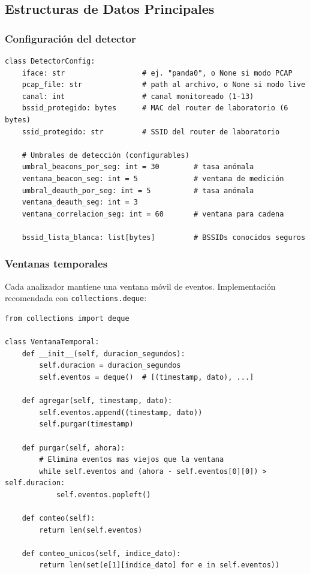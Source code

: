 \documentclass[11pt,a4paper]{article}
\begin{document}
\subsection{Estructuras de Datos Principales}

\subsubsection{Configuración del detector}

\begin{lstlisting}
class DetectorConfig:
    iface: str                  # ej. "panda0", o None si modo PCAP
    pcap_file: str              # path al archivo, o None si modo live
    canal: int                  # canal monitoreado (1-13)
    bssid_protegido: bytes      # MAC del router de laboratorio (6 bytes)
    ssid_protegido: str         # SSID del router de laboratorio

    # Umbrales de detección (configurables)
    umbral_beacons_por_seg: int = 30        # tasa anómala
    ventana_beacon_seg: int = 5             # ventana de medición
    umbral_deauth_por_seg: int = 5          # tasa anómala
    ventana_deauth_seg: int = 3
    ventana_correlacion_seg: int = 60       # ventana para cadena

    bssid_lista_blanca: list[bytes]         # BSSIDs conocidos seguros
\end{lstlisting}

\subsubsection{Ventanas temporales}

Cada analizador mantiene una ventana móvil de eventos. Implementación
recomendada con \texttt{collections.deque}:

\begin{lstlisting}
from collections import deque

class VentanaTemporal:
    def __init__(self, duracion_segundos):
        self.duracion = duracion_segundos
        self.eventos = deque()  # [(timestamp, dato), ...]

    def agregar(self, timestamp, dato):
        self.eventos.append((timestamp, dato))
        self.purgar(timestamp)

    def purgar(self, ahora):
        # Elimina eventos mas viejos que la ventana
        while self.eventos and (ahora - self.eventos[0][0]) > self.duracion:
            self.eventos.popleft()

    def conteo(self):
        return len(self.eventos)

    def conteo_unicos(self, indice_dato):
        return len(set(e[1][indice_dato] for e in self.eventos))
\end{lstlisting}
\end{document}
